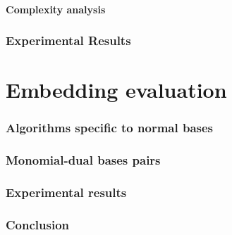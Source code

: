 \documentclass[12pt]{article}
\theoremstyle{plain}
\theoremstyle{definition}
\begin{document}
\subsection{Complexity analysis}

\section{Experimental Results}


\part{Embedding evaluation}


\section{Algorithms specific to normal bases}


\section{Monomial-dual bases pairs}


\section{Experimental results}


\section{Conclusion}




\end{document}
